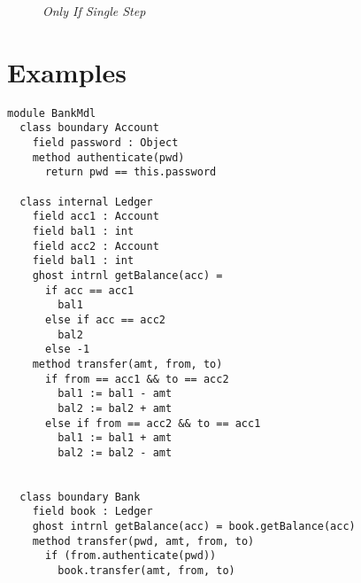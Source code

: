 \documentclass[acmsmall,review,anonymous]{acmart}\settopmatter{printfolios=true,printccs=false,printacmref=false}
\begin{document}
\begin{figure}[t]
\footnotesize
{}
\caption{\emph{Only If Single Step}}
\label{f:only-if-single}
\end{figure}

%

\section{Examples}

\begin{lstlisting}[mathescape=true, frame=lines]
module BankMdl
  class boundary Account
    field password : Object
    method authenticate(pwd)
      return pwd == this.password

  class internal Ledger
    field acc1 : Account
    field bal1 : int
    field acc2 : Account
    field bal1 : int
    ghost intrnl getBalance(acc) = 
      if acc == acc1
        bal1
      else if acc == acc2
        bal2
      else -1
    method transfer(amt, from, to)
      if from == acc1 && to == acc2
        bal1 := bal1 - amt
        bal2 := bal2 + amt
      else if from == acc2 && to == acc1
        bal1 := bal1 + amt
        bal2 := bal2 - amt
      

  class boundary Bank
    field book : Ledger
    ghost intrnl getBalance(acc) = book.getBalance(acc)
    method transfer(pwd, amt, from, to)
      if (from.authenticate(pwd))
        book.transfer(amt, from, to)
\end{lstlisting}
\end{document}
